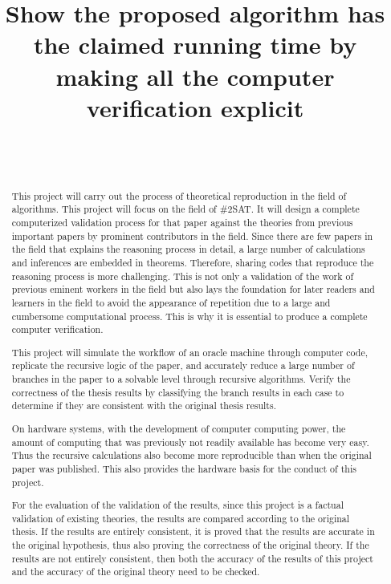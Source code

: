 \documentclass{sigchi}
\def\plaintitle{Show the proposed algorithm has the claimed running time by making all the computer verification explicit}
\begin{document}
\title{\plaintitle}

\author{%
	\\
	\\
	
	
}

\maketitle

\begin{abstract}
  This project will carry out the process of theoretical reproduction in the field of algorithms. This project will focus on the field of \#2SAT. It will design a complete computerized validation process for that paper against the theories from previous important papers by prominent contributors in the field. Since there are few papers in the field that explains the reasoning process in detail, a large number of calculations and inferences are embedded in theorems. Therefore, sharing codes that reproduce the reasoning process is more challenging. This is not only a validation of the work of previous eminent workers in the field but also lays the foundation for later readers and learners in the field to avoid the appearance of repetition due to a large and cumbersome computational process. This is why it is essential to produce a complete computer verification.
  
  This project will simulate the workflow of an oracle machine through computer code, replicate the recursive logic of the paper, and accurately reduce a large number of branches in the paper to a solvable level through recursive algorithms. Verify the correctness of the thesis results by classifying the branch results in each case to determine if they are consistent with the original thesis results.
  
  On hardware systems, with the development of computer computing power, the amount of computing that was previously not readily available has become very easy. Thus the recursive calculations also become more reproducible than when the original paper was published. This also provides the hardware basis for the conduct of this project.
  
  For the evaluation of the validation of the results, since this project is a factual validation of existing theories, the results are compared according to the original thesis. If the results are entirely consistent, it is proved that the results are accurate in the original hypothesis, thus also proving the correctness of the original theory. If the results are not entirely consistent, then both the accuracy of the results of this project and the accuracy of the original theory need to be checked.
\end{abstract}
\end{document}
